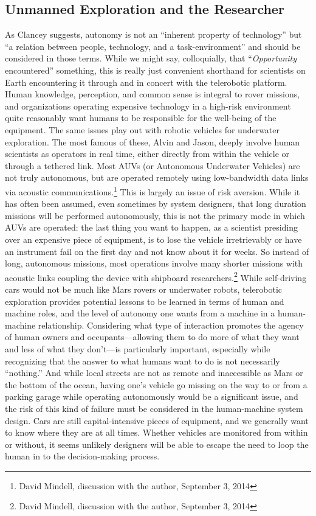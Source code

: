 \subsection{Unmanned Exploration and the Researcher}

As Clancey suggests, autonomy is not an ``inherent property of
technology'' but ``a relation between people, technology, and a
task-environment'' and should be considered in those terms\cite[p.
  119]{???-clancey}. While we might say, colloquially, that
``\emph{Opportunity} encountered'' something,\cite[p. 8]{???-clancey} this
is really just convenient shorthand for scientists on Earth encountering it
through and in concert with the telerobotic platform. Human knowledge,
perception, and common sense is integral to rover missions, and
organizations operating expensive 
technology in a high-risk environment quite reasonably want humans to
be responsible
for the well-being of the equipment. The same issues play out with
robotic vehicles for underwater exploration. The most famous of these,
Alvin and Jason, deeply involve human scientists as operators in real
time, either directly from within the vehicle or through a tethered
link.\cite{???} Most AUVs (or Autonomous Underwater Vehicles) are not
truly autonomous, but are operated remotely using low-bandwidth data
links via acoustic communications.\footnote{David Mindell, discussion
  with the author, September 3, 2014} This is largely an issue of risk
aversion. While it has often been assumed, even sometimes by system
designers, that long duration missions will be performed autonomously,
this is not the primary mode in which AUVs are operated: the last
thing you want to happen, as a scientist presiding over an expensive
piece of equipment, is to lose the vehicle irretrievably or have an
instrument fail on the first day and not know about it for weeks. So
instead of long, autonomous missions, most operations involve many
shorter missions with acoustic links coupling the device with
shipboard researchers.\footnote{David Mindell, discussion with the
  author, September 3, 2014} While self-driving cars would not
be much like Mars rovers or underwater robots, telerobotic exploration
provides potential lessons
to be learned in terms of human and machine roles, and the level of
autonomy one wants from a machine in a human-machine relationship.
Considering what type of interaction promotes the agency
of human owners and occupants---allowing them to do more of what they
want and less of what they don't---is particularly important,
especially while recognizing that the answer to what humans want to do
is not necessarily ``nothing.'' And while local streets are not as
remote and inaccessible as Mars or the bottom of the ocean, having
one's vehicle go missing on the way to or from a parking garage while
operating autonomously would be a significant issue, and the risk of
this kind of failure must be considered in the human-machine system
design. Cars are still capital-intensive pieces of equipment, and we
generally want to know where they are at all times. Whether vehicles
are monitored
from within or without, it seems unlikely designers will be able to
escape the need to loop the human in to the decision-making process.


